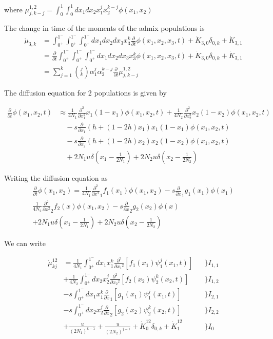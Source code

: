 \documentclass[a4paper, 12pt]{article}
\newcommand{\del}[1]{\ensuremath{\frac{\partial}{\partial #1}}}
\newcommand{\dell}[1]{\ensuremath{\frac{\partial^2}{\partial {#1}^2}}}
\begin{document}
where 
$\mu_{j,k-j}^{1,2} = 
\int_0^1 \int_0^1dx_1 dx_2 x_1^jx_2^{k -j} \phi(x_1,x_2)$

The change in time of the moments of the admix populations is
\begin{align}
  \dot \mu_{3,k}
  &= \int_{0^+}^{1^-} \int_{0^+}^{1^-} \int_{0^+}^{1^-} dx_1 dx_2 dx_3 x_3^k \del t 
  \phi(x_1, x_2, x_3,t) 
  + \dot K_{3,0} \delta_{0,k} + \dot K_{3,1}
  \nonumber \\
  &= \del t \int_{0^+}^{1^-}\int_{0^+}^{1^-} \int_{0^+}^{1^-} dx_1 dx_2 dx_3 x_3^k 
  \phi(x_1, x_2, x_3,t) 
  + \dot K_{3,0} \delta_{0,k} + \dot K_{3,1}
  \nonumber \\
  &= \sum_{j=1}^k\binom{j}{k} \alpha_1^j\alpha_2^{k -j} 
  \del t \mu_{j,k-j}^{1,2}
\end{align}

The diffusion equation for 2 populations is given by 

\begin{align}
\label{eq:difeq_2p}
\frac{\partial}{\partial t} \phi(x_1, x_2, t) & \approx 
\frac{1}{4N_1}\frac{\partial^2}{\partial x_1^2} 
x_1 (1 - x_1) \phi(x_1, x_2,t) 
+ \frac{1}{4N_2}\frac{\partial^2}{\partial x_2^2} 
x_2 (1 - x_2) \phi(x_1, x_2,t) \\ \nonumber
& \quad -s\frac{\partial}{\partial x_1} 
(h + (1 - 2 h)x_1)
x_1 (1 - x_1) \phi(x_1,x_2,t) \\ \nonumber
& \quad -s\frac{\partial}{\partial x_2} 
(h + (1 - 2 h)x_2)
x_2 (1 - x_2) \phi(x_1,x_2,t) \\ \nonumber
& \quad + 2 N_1 u \delta(x_1 - \frac{1}{2N_1})
+ 2 N_2 u \delta(x_2 - \frac{1}{2N_2})
\end{align}

Writing the diffusion equation as 
\begin{align}
  \del t \phi (x_1,x_2) =  
  \frac{1}{4N_1} \dell x_1 f_1(x_1)\phi(x_1, x_2) - s \del x_1 g_1(x_1)\phi(x_1) 
  \nonumber \\
  \frac{1}{4N_2} \dell x_2 f_2(x)\phi(x_1, x_2) - s \del x_2 g_2(x_2)\phi(x) 
  \nonumber \\
  + 2N_1u\delta(x_1  - \frac{1}{2N_1})
  + 2N_2u\delta(x_2  - \frac{1}{2N_2})
\end{align}

We can write 

\begin{align}
  \dot \mu_{kj}^{12}
  &= \frac{1}{4N_1}\int_{0^+}^{1^-}dx_1 x_1^k \dell {x_1} [f_1(x_1)\psi_1^j(x_1,t)] 
  & & \bigg\} I_{1,1}
  \nonumber \\
  \quad&+ \frac{1}{4N_2}\int_{0^+}^{1^-}dx_2 x_2^j \dell {x_2} [f_2(x_2)\psi_2^k(x_2,t)] 
  & & \bigg\} I_{1,2}
  \nonumber \\
  \quad &- s\int_{0^+}^{1^-}dx_1 x_1^k \del x_1 [g_1(x_1)\psi_1^j(x_1,t)] 
  & & \bigg\} I_{2,1}
  \nonumber \\
  \quad &- s\int_{0^+}^{1^-}dx_2 x_2^j \del x_2 [g_2(x_2)\psi_2^k(x_2,t)] 
  & & \bigg\} I_{2,2}
  \nonumber \\
  \quad &+\frac{u}{(2N_1)^{k -1}} +\frac{u}{(2N_2)^{j -1}}
  + \dot K_0^{12} \delta_{0,k} + \dot K_1^{12} 
  & & \bigg\} I_{0}
  \nonumber \\
  \label{eq:dmk3}
\end{align}
\end{document}
